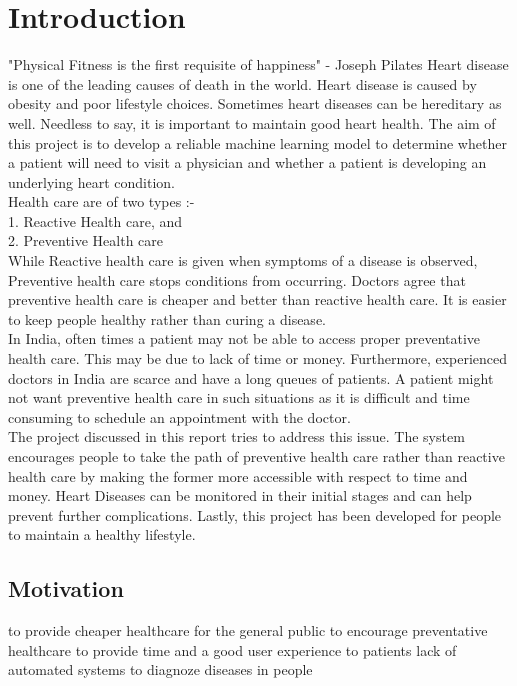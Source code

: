 

\chapter{Introduction}
"Physical Fitness is the first requisite of happiness" - Joseph Pilates
Heart disease is one of the leading causes of death in the world. Heart disease is caused by obesity and poor lifestyle choices. Sometimes heart diseases can be hereditary as well. Needless to say, it is important to maintain good heart health. The aim of this project is to develop a reliable machine learning model to determine whether a patient will need to visit a physician and whether a patient is developing an underlying heart condition. 
\\
Health care are of two types :-
\\1. Reactive Health care, and
\\2. Preventive Health care
\\While Reactive health care is given when symptoms of a disease is observed, Preventive health care stops conditions from occurring. Doctors agree that preventive health care is cheaper and better than reactive health care. It is easier to keep people healthy rather than curing a disease.
\\ 
In India, often times a patient may not be able to access proper preventative health care. This may be due to lack of  time or money. Furthermore, experienced doctors in India are scarce and have a long queues of patients. A patient might not want preventive health care in such situations as it is difficult and time consuming to schedule an appointment with the doctor.  
\\
The project discussed in this report tries to address this issue. The system encourages people to take the path of preventive health care rather than reactive health care by making the former more accessible with respect to time and money. Heart Diseases can be monitored in their initial stages and can help prevent further complications. Lastly, this project has been developed for people to maintain a healthy lifestyle.


\section{Motivation}
to provide cheaper healthcare for the general public
to encourage preventative healthcare 
to provide time and a good user experience to patients
lack of automated systems to diagnoze diseases in people

